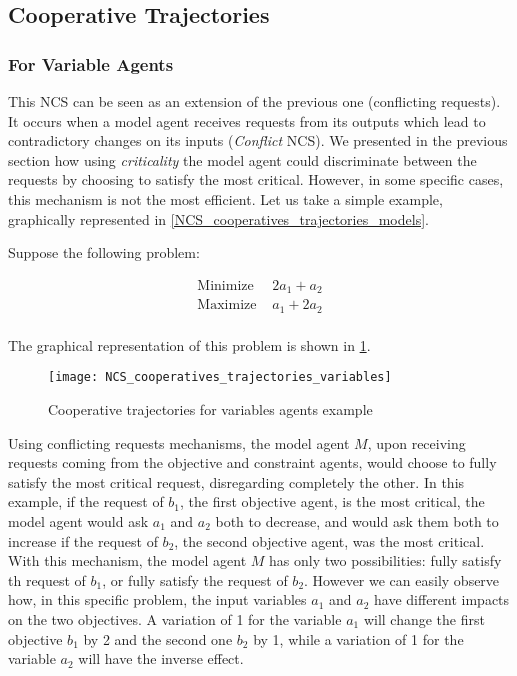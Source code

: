 \subsection{Cooperative Trajectories}

\subsubsection{For Variable Agents}

This NCS can be seen as an extension of the previous one (conflicting requests). It occurs when a model agent receives requests from its outputs which lead to contradictory changes on its inputs (\emph{Conflict} NCS). We presented in the previous section how using \emph{criticality} the model agent could discriminate between the requests by choosing to satisfy the most critical. However, in some specific cases, this mechanism is not the most efficient. Let us take a simple example, graphically represented in \figurename{} \ref{NCS_cooperatives_trajectories_models}.

Suppose the following problem:

\begin{align*}
\text{Minimize } &2a_1 + a_2\\
\text{Maximize } &a_1 + 2a_2\\
\end{align*}

The graphical representation of this problem is shown in \figurename{} \ref{NCS_cooperatives_trajectories_variables}.

\begin{figure}
\centering
\texttt{[image: NCS\_cooperatives\_trajectories\_variables]}
\caption{Cooperative trajectories for variables agents example}\label{NCS_cooperatives_trajectories_variables}
\end{figure}

Using conflicting requests mechanisms, the model agent $M$, upon receiving requests coming from the objective and constraint agents, would choose to fully satisfy the most critical request, disregarding completely the other. In this example, if the request of $b_1$, the first objective agent, is the most critical, the model agent would ask $a_1$ and $a_2$ both to decrease, and would ask them both to increase if the request of $b_2$, the second objective agent, was the most critical.\\
With this mechanism, the model agent $M$ has only two possibilities: fully satisfy th request of $b_1$, or fully satisfy the request of $b_2$. However we can easily observe how, in this specific problem, the input variables $a_1$ and $a_2$ have different impacts on the two objectives. A variation of 1 for the variable $a_1$ will change the first objective $b_1$ by 2 and the second one $b_2$  by 1, while a variation of 1 for the variable $a_2$ will have the inverse effect.

